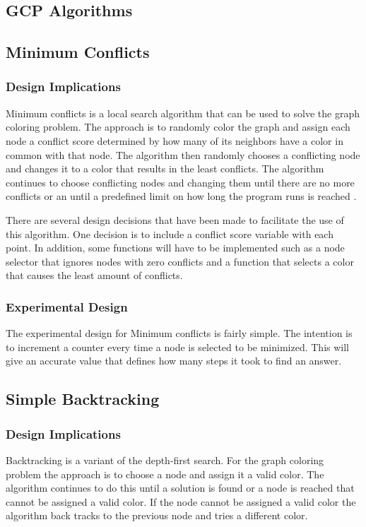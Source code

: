 \documentclass{article}
\begin{document}
\begin{multicols}{2}
\section{GCP Algorithms}
\label{algorithms}

\subsection{Minimum Conflicts}
\subsubsection{Design Implications}
Minimum conflicts is a local search algorithm that can be used to solve the graph coloring problem. The approach is to randomly color the graph and assign each node a conflict score determined by how many of its neighbors have a color in common with that node. The algorithm then randomly chooses a conflicting node and changes it to a color that results in the least conflicts. The algorithm continues to choose conflicting nodes and changing them until there are no more conflicts or an until a predefined limit on how long the program runs is reached \cite{ai}. \par
There are several design decisions that have been made to facilitate the use of this algorithm. One decision is to include a conflict score variable with each point. In addition, some functions will have to be implemented such as a node selector that ignores nodes with zero conflicts and a function that selects a color that causes the least amount of conflicts.
\subsubsection{Experimental Design}
The experimental design for Minimum conflicts is fairly simple. The intention is to increment a counter every time a node is selected to be minimized. This will give an accurate value that defines how many steps it took to find an answer.

\subsection{Simple Backtracking}
\subsubsection{Design Implications}
Backtracking is a variant of the depth-first search. For the graph coloring problem the approach is to choose a node and assign it a valid color. The algorithm continues to do this until a solution is found or a node is reached that cannot be assigned a valid color. If the node cannot be assigned a valid color the algorithm back tracks to the previous node and tries a different color.  


\end{multicols}
\end{document}
